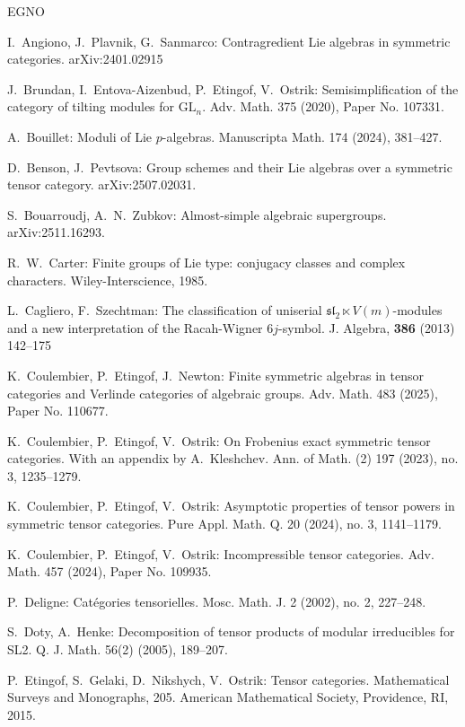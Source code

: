 \documentclass[11pt,a4paper,reqno]{amsart}
\theoremstyle{definition}
\numberwithin{equation}{section}
\newcommand{\fsl}{\mathfrak{sl}}
\newcommand{\GL}{\mathrm{GL}}
\begin{document}
\begin{thebibliography}{EGNO}

 I.~Angiono, J.~Plavnik, G.~Sanmarco: Contragredient Lie algebras in symmetric categories. arXiv:2401.02915

 J.~Brundan, I.~Entova-Aizenbud, P.~Etingof, V.~Ostrik: Semisimplification of the category of tilting modules for $\GL_n$. Adv. Math. 375 (2020), Paper No. 107331.

 A.~Bouillet: Moduli of Lie $p$-algebras. Manuscripta Math. 174 (2024), 381--427.

 D.~Benson, J.~Pevtsova: Group schemes and their Lie algebras over a symmetric tensor category. arXiv:2507.02031.

 S.~Bouarroudj, A.~N.~Zubkov: Almost-simple algebraic supergroups. arXiv:2511.16293.

 R.~W.~Carter: Finite groups of Lie type: conjugacy classes and complex characters. Wiley-Interscience, 1985.

L.~Cagliero, F.~Szechtman: The classification of uniserial $\fsl_2\ltimes V(m)$-modules and a new interpretation of the Racah-Wigner $6j$-symbol. J. Algebra, \textbf{386} (2013) 142--175

 K.~Coulembier, P.~Etingof, J.~Newton: Finite symmetric algebras in tensor categories and Verlinde categories of algebraic groups. Adv. Math. 483 (2025), Paper No. 110677.

 K.~Coulembier, P.~Etingof, V.~Ostrik: On Frobenius exact symmetric tensor categories. With an appendix by A.~Kleshchev. Ann. of Math. (2) 197 (2023), no. 3, 1235--1279.

  K.~Coulembier, P.~Etingof, V.~Ostrik: Asymptotic properties of tensor powers in symmetric tensor categories. Pure Appl. Math. Q. 20 (2024), no. 3, 1141--1179.

 K.~Coulembier, P.~Etingof, V.~Ostrik: Incompressible tensor categories. Adv. Math. 457 (2024), Paper No. 109935.

 P.~Deligne: Cat\'egories tensorielles. Mosc. Math. J. 2 (2002), no. 2, 227--248.

 S.~Doty, A.~Henke: Decomposition of tensor products of modular irreducibles for SL2. Q. J. Math. 56(2) (2005), 189--207.

 P.~Etingof, S.~Gelaki, D.~Nikshych, V.~Ostrik: Tensor categories. Mathematical Surveys and Monographs, 205. American Mathematical Society, Providence, RI, 2015. 


\end{thebibliography}
\end{document}
